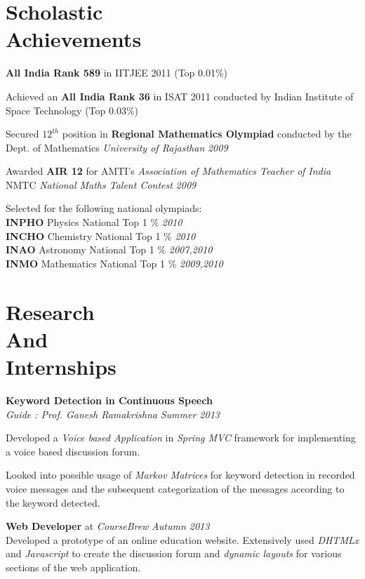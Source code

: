 \documentclass[margin,11pt]{resume}
\begin{document}
\begin{resume}

\vspace{25mm}

\section{\mysidestyle Scholastic\\Achievements}

\begin{list2}
\item \textbf{All India Rank 589} in IITJEE 2011 (Top 0.01\%)
\item Achieved an \textbf{All India Rank 36} in ISAT 2011 conducted by Indian Institute of Space Technology (Top 0.03\%)
\item Secured $12^{th}$ position in \textbf{Regional Mathematics Olympiad} conducted by the Dept. of Mathematics \emph{University of Rajasthan} \hfill \emph{2009}
\item Awarded \textbf{AIR 12} for AMTI's \emph{Association of Mathematics Teacher of India} NMTC \emph{National Maths Talent Contest} \hfill \emph{2009}
\item Selected for the following national olympiads: \\
 \textbf{  INPHO} Physics National Top 1 \% \hfill \emph{2010} \\
 \textbf{  INCHO} Chemistry National Top 1 \% \hfill \emph{2010} \\
 \textbf{  INAO} Astronomy National Top 1 \% \hfill \emph{2007,2010} \\
 \textbf{  INMO} Mathematics National Top 1 \% \hfill \emph{2009,2010} \\
\end{list2}
\section{\mysidestyle Research\\And\\Internships }
\textbf{Keyword Detection in Continuous Speech} \\
    \textsl{Guide : Prof. Ganesh Ramakrishna} \hfill \emph{Summer 2013}
\begin{list2}
\item Developed a \emph{Voice based Application} in \emph{Spring MVC} framework for implementing a voice based discussion forum. 
\item Looked into possible usage of \emph{Markov Matrices} for keyword detection in recorded voice messages and the subsequent categorization of the messages according to the keyword detected.
\end{list2}
\textbf{Web Developer} at \emph{CourseBrew} \hfill \emph{Autumn 2013} \\
Developed a prototype of an online education website. Extensively used \emph{DHTMLx} and \emph{Javascript} to create the discussion forum and \emph{dynamic layouts} for various sections of the web application.



\end{resume}
\end{document}
